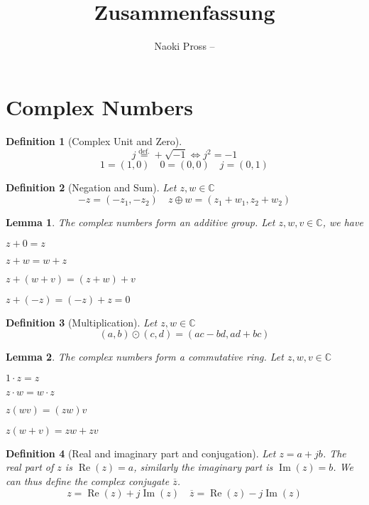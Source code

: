 \documentclass[twocolumn, small]{tex/hsrzf}
\author{Naoki Pross -- \texttt{\theauthoremail}}
\title{\texttt{\themodule} Zusammenfassung}
\date{\thesemester}
\newcommand\defeq{\overset{\mathrm{def.}}{=}}
\newcommand\Cset{\mathbb{C}}
\newcommand\conj[1]{\overline{#1}}
\renewcommand\Re{\operatorname{Re}}
\renewcommand\Im{\operatorname{Im}}
\theoremstyle{komfourzf}
\newtheorem{definition}{Definition}
\newtheorem{lemma}{Lemma}
\begin{document}
\section{Complex Numbers}

\begin{definition}[Complex Unit and Zero]
  \[
    j \defeq +\sqrt{-1} \iff j^2 = -1
  \]
  \[
    1 = (1,0) \quad 0 = (0,0) \quad j = (0,1)
  \]
\end{definition}

\begin{definition}[Negation and Sum] Let \(z, w \in \Cset\)
\[
  -z = (-z_1, -z_2) \quad
  z \oplus w =  (z_1 + w_1, z_2 + w_2)
\]
\end{definition}

\begin{lemma}
  The complex numbers form an additive group. Let \(z, w, v \in \Cset\), we have
  \begin{description}[leftmargin=3cm]
    \item[Identity] \(z + 0 = z\)
    \item[Commutativity] \(z + w = w + z\)
    \item[Associativity] \(z + (w + v) = (z + w) + v\)
    \item[Inverse property] \(z + (-z) = (-z) + z = 0\)
  \end{description}
\end{lemma}

\begin{definition}[Multiplication] Let \(z, w \in \Cset\)
  \[
    (a,b) \odot (c,d) = (ac - bd, ad + bc)
  \]
\end{definition}

\begin{lemma} The complex numbers form a commutative ring. Let \(z,w,v \in\Cset\)
  \begin{description}[leftmargin=3cm]
    \item[Identity] \(1\cdot z = z\)
    \item[Commutativity] \(z \cdot w = w \cdot z\)
    \item[Associativity] \(z (w v) = (z w) v\)
    \item[Distributivity] \(z (w + v) = zw + zv\)
  \end{description}
\end{lemma}

\begin{definition}[Real and imaginary part and conjugation]
  Let \(z = a + jb\). The \emph{real} part of \(z\) is \(\Re(z) = a\), similarly the \emph{imaginary} part is \(\Im(z) = b\). We can thus define the \emph{complex conjugate} \(\conj{z}\).
  \[
    z = \Re(z) + j\Im(z)
    \quad
    \conj{z} = \Re(z) - j\Im(z)
  \]
\end{definition}
\end{document}
